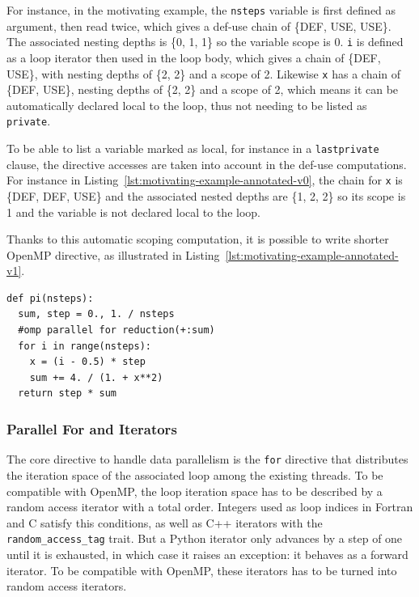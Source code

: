 \documentclass[conference]{IEEEtran}
\begin{document}
For instance, in the motivating example, the \texttt{nsteps} variable is first
defined as argument, then read twice, which gives a def-use chain of
\{DEF, USE, USE\}. The associated nesting depths is
\{0, 1, 1\} so the variable scope is 0. \texttt{i} is defined as a loop iterator
then used in the loop body, which gives a chain of \{DEF, USE\}, with nesting
depths of \{2, 2\} and a scope of 2. Likewise \texttt{x} has a chain of
\{DEF, USE\}, nesting depths of \{2, 2\} and a scope of 2, which means it can be
automatically declared local to the loop, thus not needing to be listed as
\texttt{private}.

To be able to list a variable marked as local, for instance in a
\texttt{lastprivate} clause, the directive accesses are taken into account in
the def-use computations. For instance in
Listing~\ref{lst:motivating-example-annotated-v0}, the chain for \texttt{x} is
\{DEF, DEF, USE\} and the associated nested depths are \{1, 2, 2\} so its scope
is 1 and the variable is not declared local to the loop.

Thanks to this automatic scoping computation, it is possible to write shorter
OpenMP directive, as illustrated in
Listing~\ref{lst:motivating-example-annotated-v1}.

\begin{lstlisting}[float, label={lst:motivating-example-annotated-v1},
  caption={Motivating example: computing $\pi$ in Python with OpenMP and
  automatic scoping.}]
def pi(nsteps):
  sum, step = 0., 1. / nsteps
  #omp parallel for reduction(+:sum)
  for i in range(nsteps):
    x = (i - 0.5) * step
    sum += 4. / (1. + x**2)
  return step * sum
\end{lstlisting}

\subsubsection{Parallel For and Iterators}

The core directive to handle data parallelism is the \texttt{for} directive that
distributes the iteration space of the associated loop among the existing
threads. To be compatible with OpenMP, the loop iteration space has to be
described by a random access iterator with a total order. Integers used as loop
indices in Fortran and C satisfy this conditions, as well as C++ iterators with
the \texttt{random\_access\_tag} trait. But a Python iterator only advances by a
step of one until it is exhausted,
in which case it raises an exception: it
behaves as a forward iterator. To be compatible with OpenMP, these iterators
has to be turned into random access iterators.
\end{document}
